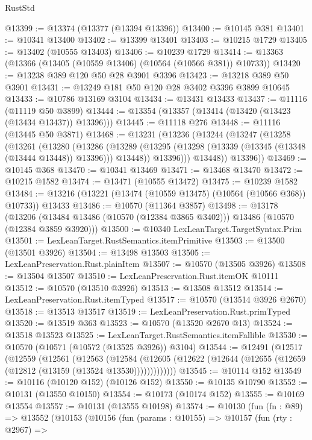 \begin{lexlean}{RustStd}
\begin{coremodule}
@13399 := @13374 (@13377 (@13394 @13396))
@13400 := @10145 @381
@13401 := @10341 @13400
@13402 := @13399 @13401
@13403 := @10215 @1729
@13405 := @13402 (@10555 @13403)
@13406 := @10239 @1729
@13414 := @13363 (@13366 (@13405 (@10559 @13406) (@10564 (@10566 @381)) @10733))
@13420 := @13238 @389 @120 @50 @28 @3901 @3396
@13423 := @13218 @389 @50 @3901
@13431 := @13249 @181 @50 @120 @28 @3402 @3396 @3899 @10645
@13433 := @10786 @13169 @3104
@13434 := @13431 @13433
@13437 := @11116 (@11119 @50 @3899)
@13444 := @13354 (@13357 (@13414 (@13420 (@13423 (@13434 @13437)) @13396)))
@13445 := @11118 @276
@13448 := @11116 (@13445 @50 @3871)
@13468 := @13231
    (@13236
      (@13244
        (@13247
          (@13258
            (@13261
              (@13280
                (@13286
                  (@13289
                    (@13295 (@13298 (@13339 (@13345 (@13348 (@13444 @13448)) @13396))) @13448))
                  @13396)))
            @13448))
        @13396))
@13469 := @10145 @368
@13470 := @10341 @13469
@13471 := @13468 @13470
@13472 := @10215 @1582
@13474 := @13471 (@10555 @13472)
@13475 := @10239 @1582
@13484 := @13216 (@13221 (@13474 (@10559 @13475) (@10564 (@10566 @368)) @10733)) @13433
@13486 := @10570 (@11364 @3857)
@13498 := @13178
    (@13206 (@13484 @13486 (@10570 (@12384 @3865 @3402))) @13486 (@10570 (@12384 @3859 @3920)))
@13500 := @10340 LexLeanTarget.TargetSyntax.Prim
@13501 := LexLeanTarget.RustSemantics.itemPrimitive
@13503 := @13500 (@13501 @3926)
@13504 := @13498 @13503
@13505 := LexLeanPreservation.Rust.plainItem
@13507 := @10570 (@13505 @3926)
@13508 := @13504 @13507
@13510 := LexLeanPreservation.Rust.itemOK @10111
@13512 := @10570 (@13510 @3926)
@13513 := @13508 @13512
@13514 := LexLeanPreservation.Rust.itemTyped
@13517 := @10570 (@13514 @3926 @2670)
@13518 := @13513 @13517
@13519 := LexLeanPreservation.Rust.primTyped
@13520 := @13519 @363
@13523 := @10570 (@13520 @2670 @13)
@13524 := @13518 @13523
@13525 := LexLeanTarget.RustSemantics.itemFallible
@13530 := @10570 (@10571 (@10572 (@13525 @3926)) @3104)
@13544 := @12491
    (@12517
      (@12559
        (@12561
          (@12563
            (@12584
              (@12605 (@12622 (@12644 (@12655 (@12659 (@12812 (@13159 (@13524 @13530)))))))))))))
@13545 := @10114 @152
@13549 := @10116 (@10120 @152) (@10126 @152)
@13550 := @10135 @10790
@13552 := @10131 (@13550 @10150)
@13554 := @10173 (@10174 @152)
@13555 := @10169 @13554
@13557 := @10131 (@13555 @10198)
@13574 := @10130
    (fun (fn : @89) =>
    @13552
      (@10153
        (@10156
          (fun (params : @10155) =>
          @10157
            (fun (rty : @2967) =>

\end{coremodule}
\end{lexlean}
